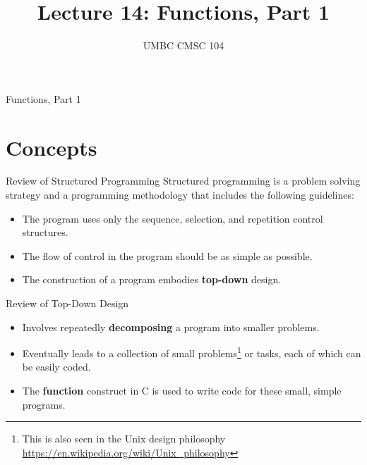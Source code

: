 \documentclass[graphics]{beamer}
\title{Lecture 14: Functions, Part 1}
\author{UMBC CMSC 104}
\date{}
\begin{document}
\begin{frame}{}
\centering
    Functions, Part 1
\end{frame}

\frame{\tableofcontents}

\section{Concepts}
\begin{frame}{Review of Structured Programming}
    Structured programming is a problem solving strategy and a programming methodology that includes the following guidelines:
    \begin{itemize}
        \item The program uses only the sequence, selection, and repetition control structures.
        \item The flow of control in the program should be as simple as possible.
        \item The construction of a program embodies \textbf{top-down} design.
    \end{itemize}
\end{frame}

\begin{frame}{Review of Top-Down Design}
    \begin{itemize}
        \item Involves repeatedly \textbf{decomposing} a program into smaller problems.
        \item Eventually leads to a collection of small problems\footnote{This is also seen in the Unix design philosophy \url{https://en.wikipedia.org/wiki/Unix_philosophy}} or tasks, each of which can be easily coded.
        \item The \textbf{function} construct in C is used to write code for these small, simple programs.
    \end{itemize}
\end{frame}
\end{document}
